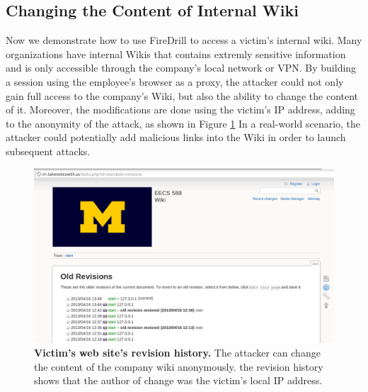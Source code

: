 \subsection{Changing the Content of Internal Wiki}
Now we demonstrate how to use FireDrill to access a victim's internal wiki. Many organizations have internal Wikis that contains extremly sensitive information and is only accessible through the company's local network or VPN. By building a session using the employee's browser as a proxy, the attacker could not only gain full access to the company's Wiki, but also the ability to change the content of it. Moreover, the modifications are done using the victim's IP address, adding to the anonymity of the attack, as shown in Figure \ref{fig:oldrevisions} In a real-world scenario, the attacker could potentially add malicious links into the Wiki in order to launch subsequent attacks.

\begin{figure}[hb]
\centering
\includegraphics[width=0.8\columnwidth]{oldrevisions.png}
\caption{\textbf{Victim's web site's revision history.} The attacker can change the content of the company wiki anonymously. the revision history shows that the author of change was the victim's local IP address.}
\label{fig:oldrevisions}
\end{figure}

